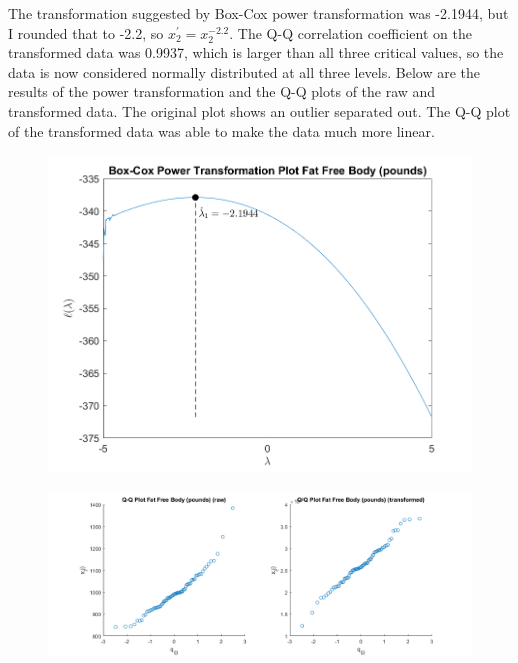 The transformation suggested by Box-Cox power transformation was -2.1944, but I rounded that to -2.2, so $x_{2}^{\prime} = x_{2}^{-2.2}$.
The Q-Q correlation coefficient on the transformed data was 0.9937, which is larger than all three critical values, so the data is now considered normally distributed at all three levels.
Below are the results of the power transformation and the Q-Q plots of the raw and transformed data.
The original plot shows an outlier separated out. The Q-Q plot of the transformed data was able to make the data much more linear.

\begin{center}
    \begin{figure}[H]
        \centering
        \includegraphics[scale=0.6]{./matlab/chapter-4/sol4.38.power.2.png}
    \end{figure}
\end{center}

\begin{center}
    \begin{figure}[H]
        \centering
        \includegraphics[scale=0.4]{./matlab/chapter-4/sol4.38.qq.2.png}
    \end{figure}
\end{center}

